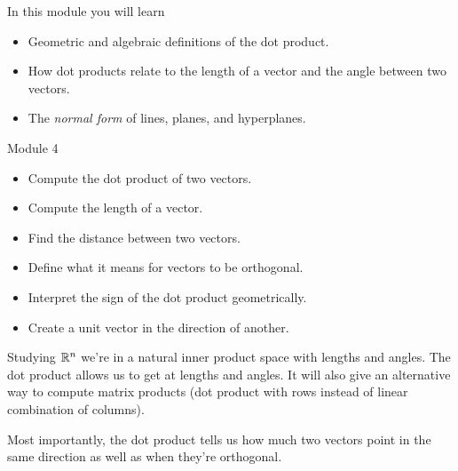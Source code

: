 \documentclass{workbook}
\begin{document}
\begin{module}

	In this module you will learn
	\begin{itemize}
		\item Geometric and algebraic definitions of the dot product.
		\item How dot products relate to the length of a vector and the angle
			between two vectors.
		\item The \emph{normal form} of lines, planes, and hyperplanes.
	\end{itemize}

	
	
\end{module}

\begin{lesson}

	Module 4

	\begin{itemize}
		\item Compute the dot product of two vectors.
		\item Compute the length of a vector.
		\item Find the distance between two vectors.
		\item Define what it means for vectors to be orthogonal.
		\item Interpret the sign of the dot product geometrically.
		\item Create a unit vector in the direction of another.
	\end{itemize}

	Studying $\mathbb{R}^n$ we're in a natural inner product space with lengths and
	angles. The dot product allows us to get at lengths and angles. It will
	also give an alternative way to compute matrix products (dot product with rows
	instead of linear combination of columns).

	Most importantly, the dot product tells us how much two vectors point in
	the same direction as well as when they're orthogonal.

\end{lesson}
\end{document}
